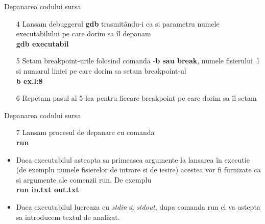 \documentclass[pdf]{beamer}
\begin{document}
\begin{frame}{Depanarea codului sursa}
\begin{itemize}
\item[4]
Lansam debuggerul \textbf{gdb} trasmitându-i ca si parametru numele executabilului pe care dorim sa îl depanam
\\
\hspace{10mm} \textbf{gdb executabil}\\
\item[5]
Setam breakpoint-urile folosind comanda  -\textbf{b sau break}, numele fisierului .l si numarul liniei pe care dorim sa setam breakpoint-ul\\
\hspace{10mm} \textbf{b ex.l:8}\\
\item[6]
Repetam pasul al 5-lea pentru fiecare breakpoint pe care dorim sa îl setam

\end{itemize}
\end{frame}



\begin{frame}{Depanarea codului sursa}
\begin{itemize}
\item[7]
Lansam procesul de depanare cu comanda\\
\hspace{10mm} \textbf{run}\\
\item
Daca executabilul asteapta sa primeasca argumente la lansarea în executie (de exemplu numele fisierelor de intrare si de iesire) acestea vor fi furnizate ca si argumente ale comenzii run. De exemplu\\
\hspace{10mm} \textbf{run in.txt out.txt}\\
\item
Daca executabilul lucreaza cu \textit{stdin} si \textit{stdout}, dupa comanda run el va astepta sa introducem textul de analizat.
\end{itemize}
\end{frame}
\end{document}
